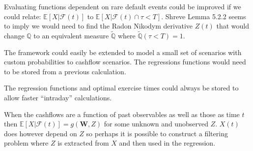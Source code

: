 \documentclass[a4paper,10pt]{article}
\newcommand{\E}{\mathbb{E}}                 %
\newcommand{\Q}{\mathbb{Q}}                 %
\begin{document}
Evaluating functions dependent on rare default events could be improved if we could relate: $\E[X|\mathcal{F}(t)]$ to $\E[X|\mathcal{F}(t)\cap \tau<T]$.  Shreve \cite{Shreve} Lemma 5.2.2 seems to imply we would need to find the Radon Nikodym derivative $Z(t)$ that would change $\Q$ to an equivalent measure $\tilde{\Q}$ where $\tilde{\Q}(\tau<T)=1$.

The framework could easily be extended to model a small set of scenarios with custom probabilities to cashflow scenarios.  The regressions functions would need to be stored from a previous calculation.

The regression functions and optimal exercise times could always be stored to allow faster ``intraday'' calculations.

When the cashflows are a function of past observables as well as those as time $t$ then $\E[X|\mathcal{F}(t)] = g(\textbf{W}, Z)$ for some unknown and unobserved $Z$. $X(t)$ does however depend on $Z$ so perhaps it is possible to construct a filtering problem where $Z$ is extracted from $X$ and then used in the regression.




\end{document}
